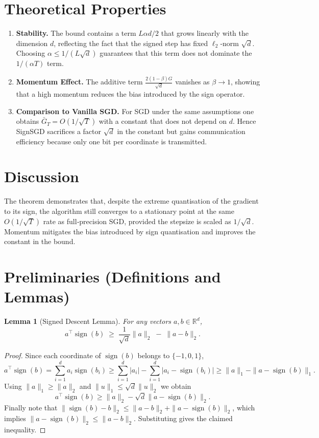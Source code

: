 \documentclass[11pt]{article}
\newtheorem{lemma}{Lemma}
\newcommand{\sign}{\operatorname{sign}}
\newcommand{\R}{\mathbb{R}}
\begin{document}
\section*{Theoretical Properties}
\begin{enumerate}[leftmargin=*]
\item \textbf{Stability.} The bound contains a term $L\alpha d/2$ that grows linearly with the dimension $d$, reflecting the fact that the signed step has fixed $\ell_2$‑norm $\sqrt{d}$. Choosing $\alpha\le 1/(L\sqrt{d})$ guarantees that this term does not dominate the $1/(\alpha T)$ term.
\item \textbf{Momentum Effect.} The additive term $\frac{2(1-\beta)G}{\sqrt{d}}$ vanishes as $\beta\to1$, showing that a high momentum reduces the bias introduced by the sign operator.
\item \textbf{Comparison to Vanilla SGD.} For SGD under the same assumptions one obtains 
$\bar{G}_T = O(1/\sqrt{T})$ with a constant that does not depend on $d$. Hence SignSGD sacrifices a factor $\sqrt{d}$ in the constant but gains communication efficiency because only one bit per coordinate is transmitted.
\end{enumerate}

\section*{Discussion}
The theorem demonstrates that, despite the extreme quantisation of the gradient to its sign, the algorithm still converges to a stationary point at the same $O(1/\sqrt{T})$ rate as full‑precision SGD, provided the stepsize is scaled as $1/\sqrt{d}$. Momentum mitigates the bias introduced by sign quantisation and improves the constant in the bound.

\newpage
\section*{Preliminaries (Definitions and Lemmas)}
\begin{lemma}[Signed Descent Lemma]\label{lem:signed-descent}
For any vectors $a,b\in\R^{d}$,
\[
a^{\top}\sign(b) \;\ge\; \frac{1}{\sqrt{d}}\|a\|_{2}\;-\;\|a-b\|_{2}.
\]
\end{lemma}
\begin{proof}
Since each coordinate of $\sign(b)$ belongs to $\{-1,0,1\}$,
\[
a^{\top}\sign(b)=\sum_{i=1}^{d}a_i\sign(b_i)
\ge\sum_{i=1}^{d}|a_i|-\sum_{i=1}^{d}|a_i-\sign(b_i)|
\ge\|a\|_{1}-\|a-\sign(b)\|_{1}.
\]
Using $\|a\|_{1}\ge\|a\|_{2}$ and $\|u\|_{1}\le\sqrt{d}\|u\|_{2}$ we obtain
\[
a^{\top}\sign(b)\ge\|a\|_{2}-\sqrt{d}\|a-\sign(b)\|_{2}.
\]
Finally note that $\|\sign(b)-b\|_{2}\le\|a-b\|_{2}+\|a-\sign(b)\|_{2}$, which
implies $\|a-\sign(b)\|_{2}\le\|a-b\|_{2}$. Substituting gives the claimed inequality. \qedhere
\end{proof}
\end{document}
